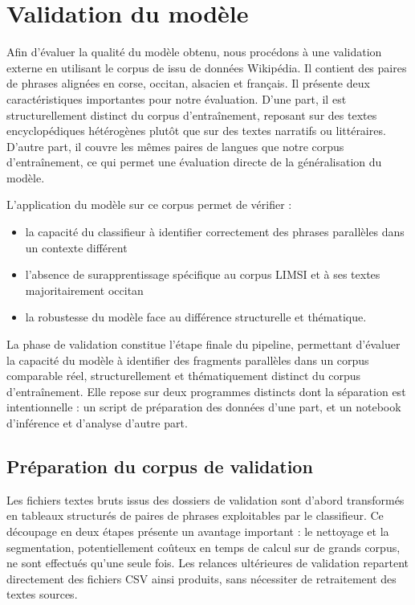 \section{Validation du modèle}

Afin d’évaluer la qualité du modèle obtenu, nous procédons à une validation externe en utilisant le corpus
de \citet{tsolakis_2024} issu de données Wikipédia. Il contient des paires de phrases alignées en corse, occitan,
alsacien et français. Il présente deux caractéristiques importantes pour notre évaluation. D'une part, il est
structurellement distinct du corpus d'entraînement, reposant sur des textes encyclopédiques hétérogènes
plutôt que sur des textes narratifs ou littéraires. D'autre part, il couvre les mêmes paires de langues que
notre corpus d'entraînement, ce qui permet une évaluation directe de la généralisation du modèle.

L’application du modèle sur ce corpus permet de vérifier{ :}
\begin{itemize}
    \item la capacité du classifieur à identifier correctement des phrases parallèles dans un contexte
    différent
    \item l’absence de surapprentissage spécifique au corpus LIMSI et à ses textes majoritairement occitan
    \item la robustesse du modèle face au différence structurelle et thématique.
\end{itemize}

La phase de validation constitue l'étape finale du pipeline, permettant d'évaluer la capacité du modèle
à identifier des fragments parallèles dans un corpus comparable réel, structurellement et thématiquement
distinct du corpus d'entraînement. Elle repose sur deux programmes distincts dont la séparation est
intentionnelle : un script de préparation des données d'une part, et un notebook d'inférence et d'analyse
d'autre part.

\subsection{Préparation du corpus de validation} \label{prepa_corpus_v}

Les fichiers textes bruts issus des dossiers de validation sont d'abord transformés en tableaux
structurés de paires de phrases exploitables par le classifieur. Ce découpage en deux étapes présente un
avantage important{ :} le nettoyage et la segmentation, potentiellement coûteux en temps de calcul
sur de grands corpus, ne sont effectués qu'une seule fois. Les relances ultérieures de validation
repartent directement des fichiers CSV ainsi produits, sans nécessiter de retraitement des textes sources.

